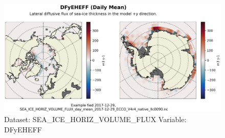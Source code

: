 \begin{figure}[H]
\centering
\includegraphics[scale=0.55]{../images/plots/native_plots/Sea-Ice_and_Snow_Horizontal_Volume_Fluxes/DFyEHEFF.png}
\caption{Dataset: SEA\_ICE\_HORIZ\_VOLUME\_FLUX Variable: DFyEHEFF}
\label{tab:table-SEA_ICE_HORIZ_VOLUME_FLUX_DFyEHEFF-Plot}
\end{figure}
\pagebreak

